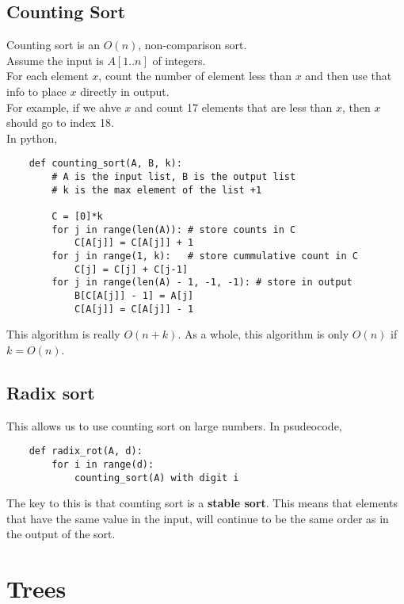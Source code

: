 \documentclass[]{article}
\begin{document}
\subsection{Counting Sort}\bigbreak

Counting sort is an $O(n)$, non-comparison sort.\\

Assume the input is $A[1..n]$ of integers.\\

For each element $x$, count the number of element less than $x$ and then use that info to place $x$ directly in output. \\

For example, if we ahve $x$ and count 17 elements that are less than $x$, then $x$ should go to index 18. \\

In python,

\begin{lstlisting}
	def counting_sort(A, B, k):
	 	# A is the input list, B is the output list
	 	# k is the max element of the list +1

		C = [0]*k
		for j in range(len(A)): # store counts in C
			C[A[j]] = C[A[j]] + 1
		for j in range(1, k):   # store cummulative count in C
			C[j] = C[j] + C[j-1]
		for j in range(len(A) - 1, -1, -1): # store in output
			B[C[A[j]] - 1] = A[j]
			C[A[j]] = C[A[j]] - 1 
\end{lstlisting}\bigbreak

This algorithm is really $O(n+k)$. As a whole, this algorithm is only $O(n)$ if $k=O(n)$.\\


\subsection{Radix sort}\bigbreak

This allows us to use counting sort on large numbers. In psudeocode,

\begin{lstlisting}
	def radix_rot(A, d):
		for i in range(d):
			counting_sort(A) with digit i
\end{lstlisting} \bigbreak

The key to this is that counting sort is a \textbf{stable sort}. This means that elements that have the same value in the input, will continue to be the same order as in the output of the sort.\\

\break
\section{Trees}\bigbreak\bigbreak
\end{document}
